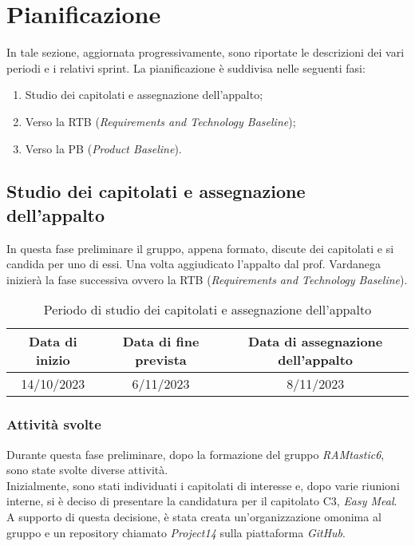 \section{Pianificazione}
In tale sezione, aggiornata progressivamente, sono riportate le descrizioni dei vari periodi e i relativi sprint.
La pianificazione è suddivisa nelle seguenti fasi:
\begin{enumerate}
    \item Studio dei capitolati e assegnazione dell'appalto;
    \item Verso la RTB (\emph{Requirements and Technology Baseline});
    \item Verso la PB (\emph{Product Baseline}).
\end{enumerate}

\subsection{Studio dei capitolati e assegnazione dell'appalto}
In questa fase preliminare il gruppo, appena formato, discute dei capitolati e si candida per uno di essi. Una volta aggiudicato l'appalto dal prof. Vardanega inizierà la fase successiva ovvero la RTB (\emph{Requirements and Technology Baseline}).

\begin{table}[h]
\centering
\captionsetup{justification=centering}

\begin{tabular}{|c|c|c|}
\hline
\textbf{Data di inizio} & \textbf{Data di fine prevista} & \textbf{Data di assegnazione dell'appalto} \\
\hline
14/10/2023 & 6/11/2023 & 8/11/2023 \\
\hline
\end{tabular}
\caption{Periodo di studio dei capitolati e assegnazione dell'appalto}
\end{table}

\subsubsection{Attività svolte}
Durante questa fase preliminare, dopo la formazione del gruppo \emph{RAMtastic6}, sono state svolte diverse attività. \\
Inizialmente, sono stati individuati i capitolati di interesse e, dopo varie riunioni interne, si è deciso di presentare la candidatura per il capitolato C3, \emph{Easy Meal}. A supporto di questa decisione, è stata creata un'organizzazione omonima al gruppo e un repository chiamato \emph{Project14} sulla piattaforma \emph{GitHub}. 

